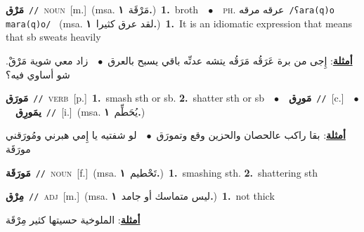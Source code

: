 \documentclass[10pt,a4paper,twoside]{article} %
\begin{document}
\begin{multicols}{2}
{\setlength\topsep{0pt}\textbf{\foreignlanguage{arabic}{مَرْق}}\ {\color{gray}\texttt{//}\color{black}}\ \textsc{noun}\ [m.]\ \color{gray}(msa. \foreignlanguage{arabic}{مَرْقَة}~\foreignlanguage{arabic}{\textbf{١.}})\color{black}\ \textbf{1.}~broth\ \ $\bullet$\ \ \textsc{ph.} \color{gray} \foreignlanguage{arabic}{عرقه مرقه}\color{black}\ {\color{gray}\texttt{/{\sffamily ʕara(q)o mara(q)o}/}\color{black}}\ \color{gray} (msa. \foreignlanguage{arabic}{لقد عرق كثيرا}~\foreignlanguage{arabic}{\textbf{١.}})\color{black}\ \textbf{1.}~It is an idiomatic expression that means that sb sweats heavily\  \begin{flushright}\color{gray}\foreignlanguage{arabic}{\textbf{\underline{\foreignlanguage{arabic}{أمثلة}}}: إِجى من برة عَرَقُه مَرَقُه يتشه عدنِّه باقي يسبح بالعرق\ $\bullet$\ \  زاد معي شوية مَرْقْ. شو أساوي فيه؟}\end{flushright}\color{black}} \vspace{2mm}

{\setlength\topsep{0pt}\textbf{\foreignlanguage{arabic}{مَورَق}}\ {\color{gray}\texttt{//}\color{black}}\ \textsc{verb}\ [p.]\ \textbf{1.}~smash sth or sb.  \textbf{2.}~shatter sth or sb\ \ $\bullet$\ \ \setlength\topsep{0pt}\textbf{\foreignlanguage{arabic}{مَورِق}}\ {\color{gray}\texttt{//}\color{black}}\ [c.]\ \ $\bullet$\ \ \setlength\topsep{0pt}\textbf{\foreignlanguage{arabic}{يمَورِق}}\ {\color{gray}\texttt{//}\color{black}}\ [i.]\ \color{gray}(msa. \foreignlanguage{arabic}{يُحَطِّم}~\foreignlanguage{arabic}{\textbf{١.}})\color{black}\  \begin{flushright}\color{gray}\foreignlanguage{arabic}{\textbf{\underline{\foreignlanguage{arabic}{أمثلة}}}: بقا راكب عالحصان والحزين وقع وتمورَق\ $\bullet$\ \  لو شفتيه يا إِمي هبرني ومُورَقني مورَقَة}\end{flushright}\color{black}} \vspace{2mm}

{\setlength\topsep{0pt}\textbf{\foreignlanguage{arabic}{مَورَقَة}}\ {\color{gray}\texttt{//}\color{black}}\ \textsc{noun}\ [f.]\ \color{gray}(msa. \foreignlanguage{arabic}{تَحْطيم}~\foreignlanguage{arabic}{\textbf{١.}})\color{black}\ \textbf{1.}~smashing sth.  \textbf{2.}~shattering sth\ } \vspace{2mm}

{\setlength\topsep{0pt}\textbf{\foreignlanguage{arabic}{مِرْق}}\ {\color{gray}\texttt{//}\color{black}}\ \textsc{adj}\ [m.]\ \color{gray}(msa. \foreignlanguage{arabic}{ليس متماسك أو جامد}~\foreignlanguage{arabic}{\textbf{١.}})\color{black}\ \textbf{1.}~not thick\  \begin{flushright}\color{gray}\foreignlanguage{arabic}{\textbf{\underline{\foreignlanguage{arabic}{أمثلة}}}: الملوخية حسيتها كثير مِرْقَة}\end{flushright}\color{black}} \vspace{2mm}


\end{multicols}
\end{document}
